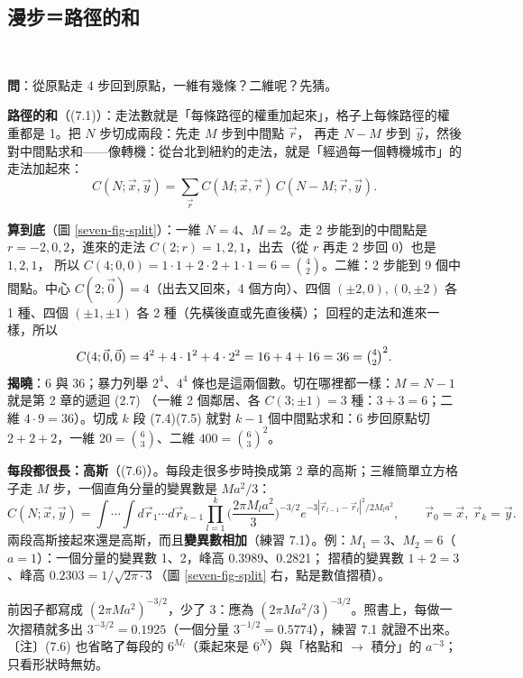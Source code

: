 \subsection{漫步＝路徑的和}
\leavevmode{}\ \par\nopagebreak

\textbf{問}：從原點走 4 步回到原點，一維有幾條？二維呢？先猜。

\textbf{路徑的和}（(7.1)）：走法數就是「每條路徑的權重加起來」，格子上每條路徑的權重都是 1。把 $N$ 步切成兩段：先走 $M$ 步到中間點 $\vec r$，
再走 $N-M$ 步到 $\vec y$，然後對中間點求和——像轉機：從台北到紐約的走法，就是「經過每一個轉機城市」的走法加起來：
\[C(N;\vec x,\vec y)=\sum_{\vec r}C(M;\vec x,\vec r)\,C(N-M;\vec r,\vec y).\tag{7.3}\]

\textbf{算到底}（圖 \ref{seven-fig-split}）：一維 $N=4$、$M=2$。走 2 步能到的中間點是 $r=-2,0,2$，進來的走法 $C(2;r)=1,2,1$，出去（從 $r$ 再走 2 步回 0）也是 $1,2,1$，
所以 $C(4;0,0)=1\cdot1+2\cdot2+1\cdot1=6=\binom42$。二維：2 步能到 9 個中間點。中心 $C(2;\vec 0)=4$（出去又回來，4 個方向）、四個 $(\pm2,0),(0,\pm2)$ 各 1 種、四個 $(\pm1,\pm1)$ 各 2 種（先橫後直或先直後橫）；
回程的走法和進來一樣，所以
\[C(4;\vec0,\vec0)=4^2+4\cdot1^2+4\cdot2^2=16+4+16=36=\tbinom42^2 .\]
\textbf{揭曉}：6 與 36；暴力列舉 $2^4$、$4^4$ 條也是這兩個數。切在哪裡都一樣：$M=N-1$ 就是第 2 章的遞迴 (2.7)
（一維 2 個鄰居、各 $C(3;\pm1)=3$ 種：$3+3=6$；二維 $4\cdot9=36$）。切成 $k$ 段 (7.4)(7.5) 就對 $k-1$ 個中間點求和：6 步回原點切 $2+2+2$，一維 $20=\binom63$、二維 $400=\binom63^2$。

\textbf{每段都很長：高斯}（(7.6)）。每段走很多步時換成第 2 章的高斯；三維簡單立方格子走 $M$ 步，一個直角分量的變異數是 $Ma^2/3$：
\[C(N;\vec x,\vec y)=\int\!\!\cdots\!\!\int d\vec r_1\cdots d\vec r_{k-1}\prod_{l=1}^{k}\Big(\frac{2\pi M_la^2}{3}\Big)^{-3/2}e^{-3|\vec r_{l-1}-\vec r_l|^2/2M_la^2},
\qquad\vec r_0=\vec x,\ \vec r_k=\vec y.\tag{7.6}\]
兩段高斯接起來還是高斯，而且\textbf{變異數相加}（練習 7.1）。例：$M_1=3$、$M_2=6$（$a=1$）：一個分量的變異數 1、2，峰高 0.3989、0.2821；
摺積的變異數 $1+2=3$、峰高 $0.2303=1/\sqrt{2\pi\cdot3}$（圖 \ref{seven-fig-split} 右，點是數值摺積）。
\begin{errbox}[p.~169--173，(7.6)(7.11)、練習 7.1]
前因子都寫成 $(2\pi Ma^2)^{-3/2}$，少了 3：應為 $(2\pi Ma^2/3)^{-3/2}$。照書上，每做一次摺積就多出 $3^{-3/2}=0.1925$（一個分量 $3^{-1/2}=0.5774$），練習 7.1 就證不出來。
〔注〕(7.6) 也省略了每段的 $6^{M_l}$（乘起來是 $6^N$）與「格點和 $\to$ 積分」的 $a^{-3}$；只看形狀時無妨。
\end{errbox}

